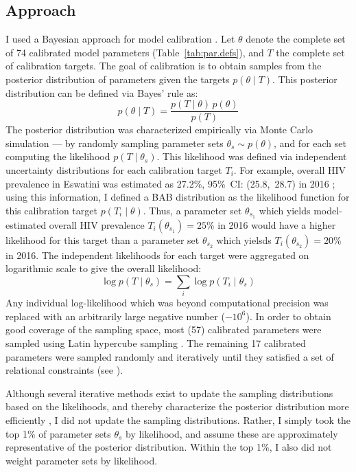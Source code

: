 \subsection{Approach}\label{model.cal.appr}
I used a Bayesian approach for model calibration \cite{Menzies2017}.
Let $\theta$ denote the complete set of 74 calibrated model parameters (Table~\ref{tab:par.defs}),
and $T$ the complete set of calibration targets.
The goal of calibration is to obtain samples from
the posterior distribution of parameters given the targets $p(\theta \mid T)$.
This posterior distribution can be defined via Bayes' rule as:
\begin{equation}
  p(\theta \mid T) = \frac{p(T \mid \theta)\,p(\theta)}{p(T)}
\end{equation}
The posterior distribution was characterized empirically via Monte Carlo simulation
--- \ie by randomly sampling parameter sets $\theta_s \sim p(\theta)$,
and for each set computing the likelihood $p(T \mid \theta_s)$.
This likelihood was defined via
independent uncertainty distributions for each calibration target $T_i$.
For example, overall HIV prevalence in Eswatini was estimated as
27.2\%, 95\%~CI: (25.8,~28.7) in 2016 \cite{SHIMS2};
using this information, I defined a BAB distribution
as the likelihood function for this calibration target $p(T_i \mid \theta)$.
Thus, a parameter set $\theta_{s_1}$ which yields
model-estimated overall HIV prevalence $T_i(\theta_{s_1}) = 25\%$ in 2016
would have a higher likelihood for this target than
a parameter set $\theta_{s_2}$ which yielsds $T_i(\theta_{s_2}) = 20\%$ in 2016.
The independent likelihoods for each target were aggregated on logarithmic scale
to give the overall likelihood:
\begin{equation}
  \log p(T \mid \theta_s) = \sum_i \log p(T_i \mid \theta_s)
\end{equation}
Any individual log-likelihood which was beyond computational precision was replaced with
an arbitrarily large negative number ($-{10}^6$).
In order to obtain good coverage of the sampling space,
most (57) calibrated parameters were sampled using Latin hypercube sampling \cite{Stein1987}.
The remaining 17 calibrated parameters were sampled randomly and iteratively
until they satisfied a set of relational constraints (see ).
\par
Although several iterative methods exist to
update the sampling distributions based on the likelihoods,
and thereby characterize the posterior distribution more efficiently \cite{Menzies2017},
I did not update the sampling distributions.
Rather, I simply took the top 1\% of parameter sets $\theta_s$ by likelihood,
and assume these are approximately representative of the posterior distribution.
Within the top 1\%, I also did not weight parameter sets by likelihood.
